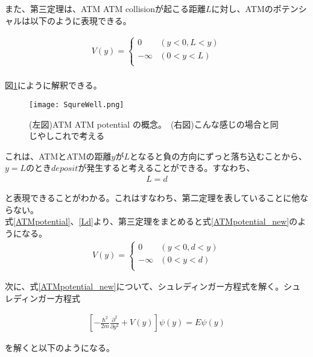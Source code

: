 また、第三定理は、ATM ATM collisionが起こる距離$L$に対し、ATMのポテンシャルは以下のように表現できる。

\begin{eqnarray}
V(y)=\left\{ \begin{array}{ll}
0 & (y<0,  L<y) \\
-\infty & (0<y<L) \\
\end{array} \right.
\label{ATMpotential}
\end{eqnarray}
\\
図\ref{SqureWell}にように解釈できる。

\begin{figure}[H]
\centering
\texttt{[image: SqureWell.png]}
\caption{(左図)ATM ATM potential の概念。\
(右図)こんな感じの場合と同じやしこれで考える}
\label{SqureWell}
\end{figure}

これは、ATMとATMの距離$y$が$L$となると負の方向にずっと落ち込むことから、$y=L$のとき$deposit$が発生すると考えることができる。すなわち、
\begin{eqnarray}
L = d
\label{Ld}
\end{eqnarray}

と表現できることがわかる。これはすなわち、第二定理を表していることに他ならない。\\
式\ref{ATMpotential}、\ref{Ld}より、第三定理をまとめると式\ref{ATMpotential_new}のようになる。
\begin{eqnarray}
V(y)=\left\{ \begin{array}{ll}
0 & (y<0,  d<y) \\
-\infty & (0<y<d) \\
\end{array} \right.
\label{ATMpotential_new}
\end{eqnarray}

次に、式\ref{ATMpotential_new}について、シュレディンガー方程式を解く。シュレディンガー方程式

\begin{eqnarray}
\left[ -\frac{\hbar^{2}}{2m} \frac{\partial^{2}}{\partial y^{2}} + V(y) \right] \psi(y)= E \psi (y) 
\label{schoredinger}
\end{eqnarray}

を解くと以下のようになる。

